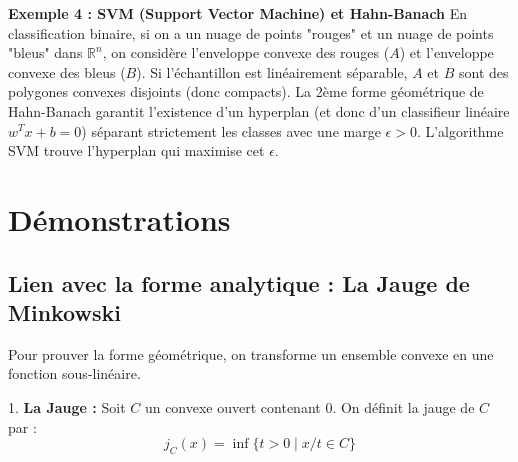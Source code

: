 \documentclass[11pt,a4paper]{article}
\begin{document}
\textbf{Exemple 4 : SVM (Support Vector Machine) et Hahn-Banach}
En classification binaire, si on a un nuage de points "rouges" et un nuage de points "bleus" dans $\mathbb{R}^n$, on considère l'enveloppe convexe des rouges ($A$) et l'enveloppe convexe des bleus ($B$).
Si l'échantillon est linéairement séparable, $A$ et $B$ sont des polygones convexes disjoints (donc compacts).
La 2ème forme géométrique de Hahn-Banach garantit l'existence d'un hyperplan (et donc d'un classifieur linéaire $w^Tx+b=0$) séparant strictement les classes avec une marge $\epsilon > 0$. L'algorithme SVM trouve l'hyperplan qui maximise cet $\epsilon$.


\begin{center}
\end{center}


\section{Démonstrations}

\subsection{Lien avec la forme analytique : La Jauge de Minkowski}

Pour prouver la forme géométrique, on transforme un ensemble convexe en une fonction sous-linéaire.

1. \textbf{La Jauge :} Soit $C$ un convexe ouvert contenant 0. On définit la jauge de $C$ par :
   $$j_C(x) = \inf \{ t > 0 \mid x/t \in C \}$$
\end{document}
